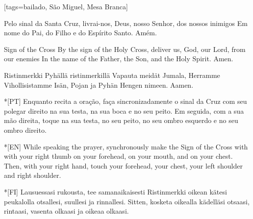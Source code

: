 %


\renewcommand{\thesongnum}{\Roman{songnum}}
\setcounter{songnum}{1}


[tags={bailado, São Miguel, Mesa Branca}]
  \begin{passage}[PT]{}\obeylines
    Pelo sinal da Santa Cruz,
    livrai-nos, Deus, nosso Senhor,
    dos nossos inimigos
    \polpar
    Em nome do Pai, do Filho e do Espírito Santo.
    \polpar
    Amém.
  \end{passage}
  \begin{passage}[EN]{Sign of the Cross}\obeylines
    By the sign of the Holy Cross,
    deliver us, God, our Lord,
    from our enemies
    \polpar
    In the name of the Father, the Son, and the Holy Spirit.
    \polpar
    Amen.
  \end{passage}
  \begin{passage}[FI]{Ristinmerkki}\obeylines
    Pyhällä ristinmerkillä
    Vapauta meidät Jumala, Herramme
    Vihollisistamme
    \polpar
    Isän, Pojan ja Pyhän Hengen nimeen.
    \polpar
    Aamen.
  \end{passage}
  \hardbrk
  \vspace*{\fill}
  \begin{passage}*[PT]{}\obeylines
    Enquanto recita a oração, faça sincronizadamente
    o sinal da Cruz com seu polegar direito
    na sua testa,
    na sua boca e
    no seu peito.
    \polpar
    Em seguida, com a sua mão direita, toque
    na sua testa,
    no seu peito,
    no seu ombro esquerdo e no seu ombro direito.
  \end{passage}
  \begin{passage}*[EN]{}\obeylines
    While speaking the prayer, synchronously make
    the Sign of the Cross with with your right thumb
    on your forehead,
    on your mouth, and
    on your chest.
    \polpar
    Then, with your right hand, touch
    your forehead,
    your chest,
    your left shoulder and right shoulder.
  \end{passage}
  \begin{passage}*[FI]{}\obeylines
    Lausuessasi rukousta, tee samanaikaisesti
    Ristinmerkki oikean kätesi peukalolla
    otsallesi,
    suullesi ja
    rinnallesi.
    \polpar
    Sitten, kosketa oikealla kädelläsi
    otsaasi,
    rintaasi,
    vasenta olkaasi ja oikeaa olkaasi.
  \end{passage}
  \vspace*{\fill}
\endsong


